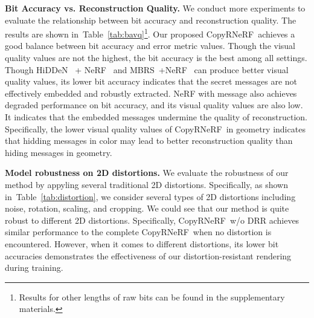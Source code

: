 \documentclass[10pt,twocolumn,letterpaper]{article}
\newcommand{\Tref}[1]{Table~\ref{#1}}
\newcommand{\Sref}[1]{Section~\ref{#1}}
\def\CopyNeRF{CopyRNeRF~}
\begin{document}
\noindent\textbf{Bit Accuracy vs. Reconstruction Quality.}
 We conduct more experiments to evaluate the relationship between bit accuracy and reconstruction quality. The results are shown in~\Tref{tab:bavq}\footnote{Results for other lengths of raw bits can be found in the supplementary materials.}. Our proposed \CopyNeRF achieves a good balance between bit accuracy and error metric values. Though the visual quality values are not the highest, the bit accuracy is the best among all settings. Though HiDDeN~\cite{zhu2018hidden} + NeRF~\cite{nerf2020} and MBRS~\cite{jia2021mbrs}+NeRF~\cite{nerf2020} can produce better visual quality values, its lower bit accuracy indicates that the secret messages are not effectively embedded and robustly extracted. NeRF with message also achieves degraded performance on bit accuracy, and its visual quality values are also low. It indicates that the embedded messages undermine the quality of reconstruction. Specifically, the lower visual quality values of \CopyNeRF in geometry indicates that hidding messages in color may lead to better reconstruction quality than hiding messages in geometry.







\noindent\textbf{Model robustness on 2D distortions.}
We evaluate the robustness of our method by appyling several traditional 2D distortions. Specifically, as shown in~\Tref{tab:distortion}, we consider several types of 2D distortions including noise, rotation, scaling, and cropping. We could see that our method is quite robust to different 2D distortions. Specifically, \CopyNeRF w/o DRR achieves similar performance to the complete \CopyNeRF when no distortion is encountered. However, when it comes to different distortions, its lower bit accuracies demonstrates the effectiveness of our distortion-resistant rendering during training.
\end{document}
